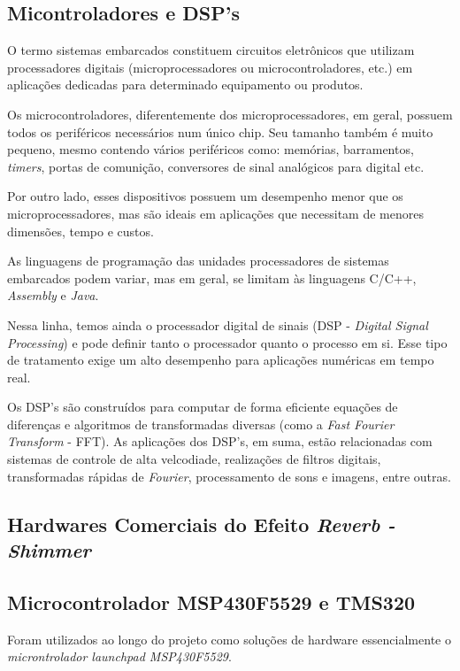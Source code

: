 		

	\subsection{Micontroladores e DSP's}

		O termo sistemas embarcados constituem circuitos eletrônicos que utilizam processadores digitais (microprocessadores ou microcontroladores, etc.) em aplicações dedicadas para determinado equipamento ou produtos.
		
		Os microcontroladores, diferentemente dos microprocessadores, em geral, possuem todos os periféricos necessários num único chip. Seu tamanho também é muito pequeno, mesmo contendo vários periféricos como: memórias, barramentos, \textit{timers}, portas de comunição, conversores de sinal analógicos para digital etc.
		
		Por outro lado, esses dispositivos possuem um desempenho menor que os microprocessadores, mas são ideais em aplicações que necessitam de menores dimensões, tempo e custos.
		
		As linguagens de programação das unidades processadores de sistemas embarcados podem variar, mas em geral, se limitam às linguagens C/C++, \textit{Assembly} e \textit{Java}.
		
		Nessa linha, temos ainda o processador digital de sinais (DSP - \textit{Digital Signal Processing}) e pode definir tanto o processador quanto o processo em si. Esse tipo de tratamento exige um alto desempenho para aplicações numéricas em tempo real.
		
		Os DSP's são construídos para computar de forma eficiente equações de diferenças e algoritmos de transformadas diversas (como a \textit{Fast Fourier Transform} - FFT). As aplicações dos DSP's, em suma, estão relacionadas com sistemas de controle de alta velcodiade, realizações de filtros digitais, transformadas rápidas de \textit{Fourier}, processamento de sons e imagens, entre outras.

	\subsection{Hardwares Comerciais do Efeito \textit{Reverb - Shimmer}}
	
	\subsection{Microcontrolador MSP430F5529 e TMS320}
	
	Foram utilizados ao longo do projeto como soluções de hardware essencialmente o \textit{microntrolador launchpad MSP430F5529}.
	
